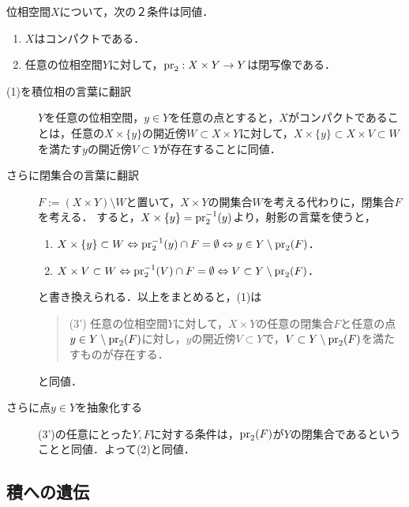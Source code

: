 \documentclass[uplatex,dvipdfmx]{jsreport}
\begin{document}
\begin{proposition}[コンパクト性の射影の言葉による特徴付け]\label{prop-characterization-of-compactness-in-terms-of-projection}
    位相空間$X$について，次の２条件は同値．
    \begin{enumerate}
        \item $X$はコンパクトである．
        \item 任意の位相空間$Y$に対して，$\mathrm{pr}_2:X\times Y\to Y$は閉写像である．
    \end{enumerate}
\end{proposition}
\begin{Proof}\mbox{}
    \begin{description}
        \item[(1)を積位相の言葉に翻訳] 
        $Y$を任意の位相空間，$y\in Y$を任意の点とすると，$X$がコンパクトであることは，任意の$X\times\{y\}$の開近傍$W\subset X\times Y$に対して，$X\times\{y\}\subset X\times V\subset W$を満たす$y$の開近傍$V\subset Y$が存在することに同値．
        \item[さらに閉集合の言葉に翻訳]
        $F:=(X\times Y)\setminus W$と置いて，$X\times Y$の開集合$W$を考える代わりに，閉集合$F$を考える．
        すると，$X\times\{y\}=\mathrm{pr}_2^{-1}(y)$より，射影の言葉を使うと，
        \begin{enumerate}
            \item $X\times\{y\}\subset W\Leftrightarrow\mathrm{pr}_2^{-1}(y)\cap F=\emptyset\Leftrightarrow y\in Y\setminus\mathrm{pr}_2(F)$．
            \item $X\times V\subset W\Leftrightarrow\mathrm{pr}_2^{-1}(V)\cap F=\emptyset\Leftrightarrow V\subset Y\setminus\mathrm{pr}_2(F)$．
        \end{enumerate}
        と書き換えられる．以上をまとめると，(1)は
        \begin{quote}
            (3') 任意の位相空間$Y$に対して，$X\times Y$の任意の閉集合$F$と任意の点$y\in Y\setminus\mathrm{pr}_2(F)$に対し，$y$の開近傍$V\subset Y$で，$V\subset Y\setminus\mathrm{pr}_2(F)$を満たすものが存在する．
        \end{quote}
        と同値．
        \item[さらに点$y\in Y$を抽象化する]
        (3')の任意にとった$Y,F$に対する条件は，$\mathrm{pr}_2(F)$が$Y$の閉集合であるということと同値．よって(2)と同値．
    \end{description}
\end{Proof}

\subsection{積への遺伝}
\end{document}

